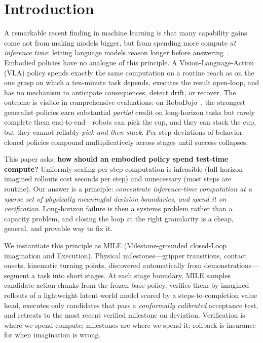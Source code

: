 \documentclass{article}
\newcommand{\mile}{\textsc{MILE}}
\begin{document}
\section{Introduction}
\label{sec:intro}

A remarkable recent finding in machine learning is that many capability gains come not from making models bigger, but from spending more compute \emph{at inference time}: letting language models reason longer before answering~\cite{testtime}. Embodied policies have no analogue of this principle. A Vision-Language-Action (VLA) policy spends exactly the same computation on a routine reach as on the one grasp on which a ten-minute task depends, executes the result open-loop, and has no mechanism to anticipate consequences, detect drift, or recover. The outcome is visible in comprehensive evaluations: on RoboDojo~\cite{robodojo}, the strongest generalist policies earn substantial \emph{partial} credit on long-horizon tasks but rarely complete them end-to-end---robots can pick the cup, and they can stack the cup, but they cannot reliably \emph{pick and then stack}. Per-step deviations of behavior-cloned policies compound multiplicatively across stages until success collapses.

This paper asks: \textbf{how should an embodied policy spend test-time compute?} Uniformly scaling per-step computation is infeasible (full-horizon imagined rollouts cost seconds per step) and unnecessary (most steps are routine). Our answer is a principle: \emph{concentrate inference-time computation at a sparse set of physically meaningful decision boundaries, and spend it on verification}. Long-horizon failure is then a systems problem rather than a capacity problem, and closing the loop at the right granularity is a cheap, general, and provable way to fix it.

We instantiate this principle as \mile{} (Milestone-grounded closed-Loop imagination and Execution). Physical milestones---gripper transitions, contact onsets, kinematic turning points, discovered automatically from demonstrations---segment a task into short stages. At each stage boundary, \mile{} samples candidate action chunks from the frozen base policy, verifies them by imagined rollouts of a lightweight latent world model scored by a steps-to-completion value head, executes only candidates that pass a \emph{conformally calibrated} acceptance test, and retreats to the most recent verified milestone on deviation. Verification is where we spend compute; milestones are where we spend it; rollback is insurance for when imagination is wrong.
\end{document}
